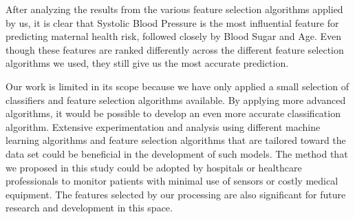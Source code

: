 \documentclass[conference]{IEEEtran}
\begin{document}
After analyzing the results from the various feature selection algorithms applied by us, it is clear that Systolic Blood Pressure is the most influential feature for predicting maternal health risk, followed closely by Blood Sugar and Age. Even though these features are ranked differently across the different
feature selection algorithms we used, they still give us the most accurate prediction.

Our work is limited in its scope because we have only applied a small selection of classifiers and feature selection algorithms available. By applying more advanced algorithms, it would be possible to develop an even more accurate classification algorithm. Extensive experimentation and analysis using different machine learning algorithms and feature selection algorithms that are tailored toward the data set could be beneficial in the development of such models. The method that we proposed in this study could be adopted by hospitals or healthcare professionals to monitor patients with minimal use of sensors or costly medical equipment. The features selected by our processing are also significant for future research and development in this space.



\end{document}
